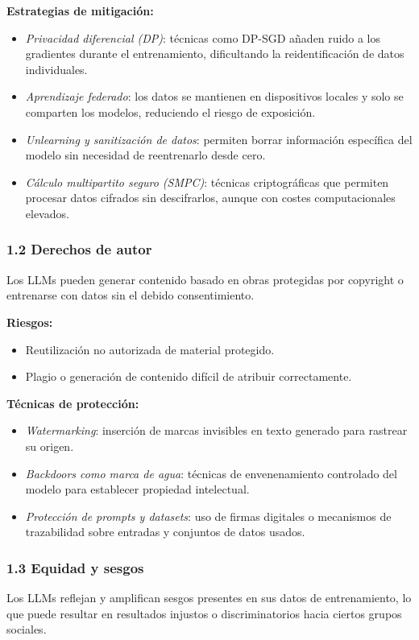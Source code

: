 \documentclass{article}
\begin{document}
\textbf{Estrategias de mitigación:}
\begin{itemize}[leftmargin=3.5em]
    \item \emph{Privacidad diferencial (DP)}: técnicas como DP-SGD añaden ruido a los gradientes durante el entrenamiento, dificultando la reidentificación de datos individuales.
    \item \emph{Aprendizaje federado}: los datos se mantienen en dispositivos locales y solo se comparten los modelos, reduciendo el riesgo de exposición.
    \item \emph{Unlearning y sanitización de datos}: permiten borrar información específica del modelo sin necesidad de reentrenarlo desde cero.
    \item \emph{Cálculo multipartito seguro (SMPC)}: técnicas criptográficas que permiten procesar datos cifrados sin descifrarlos, aunque con costes computacionales elevados.
\end{itemize}

\subsubsection*{1.2 Derechos de autor}
Los LLMs pueden generar contenido basado en obras protegidas por copyright o entrenarse con datos sin el debido consentimiento.

\textbf{Riesgos:}
\begin{itemize}[leftmargin=3.5em]
    \item Reutilización no autorizada de material protegido.
    \item Plagio o generación de contenido difícil de atribuir correctamente.
\end{itemize}

\textbf{Técnicas de protección:}
\begin{itemize}[leftmargin=3.5em]
    \item \emph{Watermarking}: inserción de marcas invisibles en texto generado para rastrear su origen.
    \item \emph{Backdoors como marca de agua}: técnicas de envenenamiento controlado del modelo para establecer propiedad intelectual.
    \item \emph{Protección de prompts y datasets}: uso de firmas digitales o mecanismos de trazabilidad sobre entradas y conjuntos de datos usados.
\end{itemize}

\subsubsection* {1.3 Equidad y sesgos}
Los LLMs reflejan y amplifican sesgos presentes en sus datos de entrenamiento, lo que puede resultar en resultados injustos o discriminatorios hacia ciertos grupos sociales.
\end{document}
